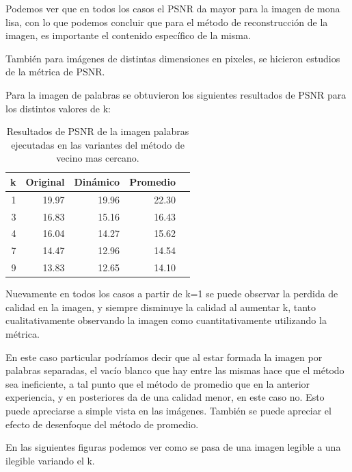 \documentclass[a4paper]{article}
\newcounter{col}
\begin{document}
Podemos ver que en todos los casos el PSNR da mayor para la imagen de mona lisa, con lo que podemos concluir que para el método de reconstrucción de la imagen, es importante el contenido específico de la misma. 


También para imágenes de distintas dimensiones en pixeles, se hicieron estudios de la métrica de PSNR.

Para la imagen de palabras se obtuvieron los siguientes resultados de PSNR para los distintos valores de k:

\begin{table}[H]
\centering
\begin{tabular}{|r|r|r|r|r|}
\hline
\multicolumn{1}{|c|}{k} & \multicolumn{1}{c|}{Original} & \multicolumn{1}{c|}{Dinámico} & \multicolumn{1}{c|}{Promedio} \\ \hline
1 & 19.97 & 19.96 & 22.30 \\ \hline
3 & 16.83 &  15.16 & 16.43 \\ \hline
4 & 16.04 &  14.27 & 15.62  \\ \hline
7 & 14.47 &  12.96 & 14.54 \\ \hline
9 &13.83 &  12.65 & 14.10 \\ \hline
\end{tabular}
\caption{Resultados de PSNR de la imagen palabras ejecutadas en las variantes del m\'etodo de vecino mas cercano.}
\label{}
\end{table}

Nuevamente en todos los casos a partir de k=1 se puede observar la perdida de calidad en la imagen, y siempre disminuye la calidad al aumentar k, tanto cualitativamente observando la imagen como cuantitativamente utilizando la métrica. 

En este caso particular podríamos decir que al estar formada la imagen por palabras separadas, el vacío blanco que hay entre las mismas hace que el método sea ineficiente, a tal punto que el método de promedio que en la anterior experiencia, y en posteriores da de una calidad menor, en este caso no. Esto puede apreciarse a simple vista en las imágenes. También se puede apreciar el efecto de desenfoque del método de promedio.


En las siguientes figuras podemos ver como se pasa de una imagen legible a una ilegible variando el k.
\end{document}
